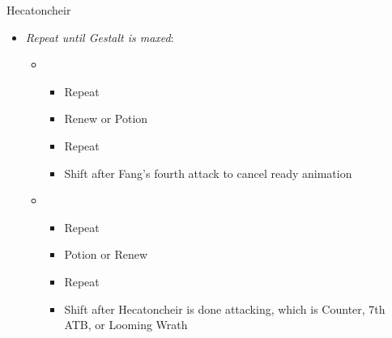 \begin{paracol}{2}
\begin{battle}{Hecatoncheir}
\begin{itemize}
\begin{itemize}
				      \item Repeat
				      \item Shift after Hecatoncheir is done attacking, which is Counter, 7th ATB, or Looming Wrath
			      \end{itemize}
			\item \textit{Repeat until Gestalt is maxed}:
			      \begin{itemize}
				      \item \third
				            \begin{itemize}
					            \item Repeat
					            \item Renew or Potion
					            \item Repeat
					            \item Shift after Fang's fourth attack to cancel ready animation
				            \end{itemize}
				      \item \fourth
				            \begin{itemize}
					            \item Repeat
					            \item Potion or Renew
					            \item Repeat
					            \item Shift after Hecatoncheir is done attacking, which is Counter, 7th ATB, or Looming Wrath
				            \end{itemize}
			      \end{itemize}
		\end{itemize}
	\end{battle}
	\switchcolumn*


\end{paracol}
